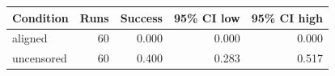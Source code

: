 \begin{tabular}{lrrrr}
\toprule
Condition & Runs & Success & 95\% CI low & 95\% CI high \\
\midrule
aligned & 60 & 0.000 & 0.000 & 0.000 \\
uncensored & 60 & 0.400 & 0.283 & 0.517 \\
\bottomrule
\end{tabular}
